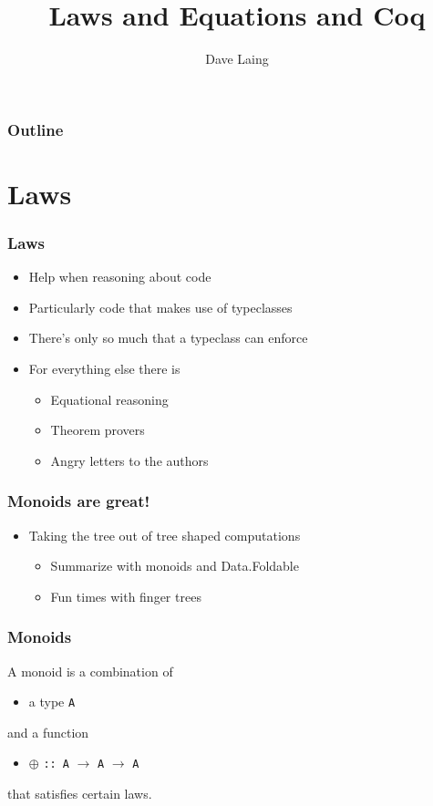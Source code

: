 \documentclass{beamer}
\title{Laws and Equations and Coq}
\author{Dave Laing}
\begin{document}
\begin{frame}
    \titlepage
\end{frame}

\begin{frame}
    \frametitle{Outline}
    \tableofcontents[pausesections]
\end{frame}

\section{Laws}

\begin{frame}
    \frametitle {Laws}

\begin{itemize}
\item Help when reasoning about code
\item Particularly code that makes use of typeclasses
\item There's only so much that a typeclass can enforce
\item For everything else there is
    \begin{itemize}
        \item Equational reasoning
        \item Theorem provers
        \item Angry letters to the authors
    \end{itemize}
\end{itemize}

\end{frame}

\begin{frame}
    \frametitle {Monoids are great!}
\begin{itemize}
\item Taking the tree out of tree shaped computations
    \begin{itemize}
        \item Summarize with monoids and Data.Foldable
        \item Fun times with finger trees
    \end{itemize}
\end{itemize}
\end{frame}

\begin{frame}[fragile]
    \frametitle {Monoids}

A monoid is a combination of 
\begin{itemize}
\item a type \verb?A?
\end{itemize}
and a function
\begin{itemize}
\item $\oplus$ \verb?:: A? $\rightarrow$ \verb?A? $\rightarrow$ \verb?A? 
\end{itemize}
that satisfies certain laws.

\end{frame}
\end{document}
